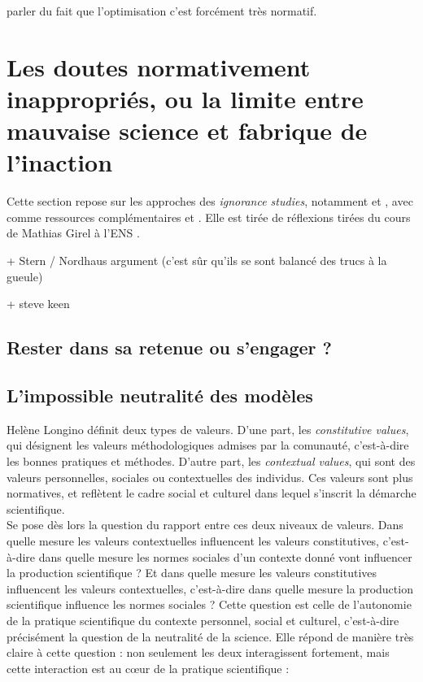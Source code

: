 \begin{tcolorbox}
    parler du fait que l'optimisation c'est forcément très normatif. 
\end{tcolorbox}

\section{Les doutes normativement inappropriés, ou la limite entre mauvaise science et fabrique de l'inaction}

Cette section repose sur les approches des \textit{ignorance studies}, notamment \cite{melo-martin_fight_2018} et \cite{gross_routledge_2015}, avec comme ressources complémentaires \cite{noauthor_carnet_2024} et \cite{proctor_agnotology_2008}. Elle est tirée de réflexions tirées du cours de Mathias Girel à l'ENS \cite{girel_vertus_2023}. 



+ Stern / Nordhaus argument (c'est sûr qu'ils se sont balancé des trucs à la gueule) 

+ steve keen \cite{keen_appallingly_2021}

\subsection{Rester dans sa retenue ou s'engager ?}

\subsection{L'impossible neutralité des modèles}

Helène Longino définit deux types de valeurs. D'une part, les \emph{constitutive values}, qui désignent les valeurs méthodologiques admises par la comunauté, c'est-à-dire les bonnes pratiques et méthodes. D'autre part, les \emph{contextual values}, qui sont des valeurs personnelles, sociales ou contextuelles des individus. Ces valeurs sont plus normatives, et reflètent le cadre social et culturel dans lequel s'inscrit la démarche scientifique. \\

Se pose dès lors la question du rapport entre ces deux niveaux de valeurs. Dans quelle mesure les valeurs contextuelles influencent les valeurs constitutives, c'est-à-dire dans quelle mesure les normes sociales d'un contexte donné vont influencer la production scientifique ? Et dans quelle mesure les valeurs constitutives influencent les valeurs contextuelles, c'est-à-dire dans quelle mesure la production scientifique influence les normes sociales ? Cette question est celle de l'autonomie de la pratique scientifique du contexte personnel, social et culturel, c'est-à-dire précisément la question de la neutralité de la science. Elle répond de manière très claire à cette question : non seulement les deux interagissent fortement, mais cette interaction est au cœur de la pratique scientifique : 

